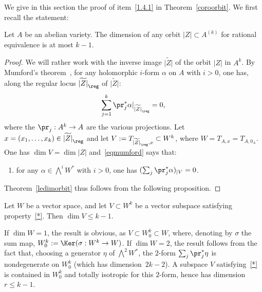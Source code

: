 We give in this section the proof of item~\eqref{1.4.1} in Theorem~\ref{coroorbit}. We first recall the statement:

\begin{theo}\label{ledimorbit}
Let $A$ be an abelian variety. The dimension of any orbit
$|Z|\subset A^{(k)}$ for rational equivalence is at most $k-1$.
\end{theo}

\begin{proof}
We will rather work with the inverse image $\widetilde{|Z|}$ of the orbit $|Z|$ in $A^k$. By Mumford's theorem~\cite{mumford}, for any holomorphic $i$-form $\alpha$ on $A$ with $i>0$, one has, along the regular locus $\widetilde{|Z|}_{{\reg}}$ of $\widetilde{|Z|}$:
\begin{equation}\label{eqmumford}
\sum_{j=1}^k\pr_j^*\alpha|_{ \widetilde{|Z|}_{\reg}}=0,
\end{equation}
where the $\pr_j:A^k\rightarrow A$ are the various projections. Let $x=(x_1,\dots,x_k)\in \widetilde{|Z|}_{\reg}$ and let $V:=T_{\widetilde{|Z|}_{\reg},x}\subset W^k$, where $W=T_{A,x}=T_{A,0_A}$. One has $\dim V=\dim |Z|$ and~\eqref{eqmumford} says that:
\begin{enumerate}
\renewcommand{\theenumi}{$\ast$}
\item \label{*} for any $\alpha\in \bigwedge^iW^*$ with $i>0$, one has $(\sum_j\pr_j^*\alpha)_{\mid V}=0$.
\end{enumerate}
Theorem~\ref{ledimorbit} thus follows from the following proposition.
\end{proof}

\begin{prop}\label{ledimorbitinfinitesimal}
Let $W$ be a vector space, and let $V\subset W^k$ be a vector subspace
satisfying property~\eqref{*}. Then $\dim V\leq k-1$.
\end{prop}

\begin{rema}
If $\dim W=1$, the result is obvious, as $V\subset W^k_0\subset W$, where,
denoting by $\sigma$ the sum map, $W^k_0:=\Ker (\sigma: W^k\rightarrow W)$. If $\dim W=2$, the result follows from the fact that, choosing a generator $\eta$ of $\bigwedge^2W^*$, the $2$-form $\sum_j\pr_j^*\eta$ is nondegenerate on $W^k_0$ (which has dimension~$2k-2$). A subspace $V$ satisfying~\eqref{*} is contained in $W^k_0$ and totally isotropic for this $2$-form, hence has dimension $r\leq k-1$.
\end{rema}


